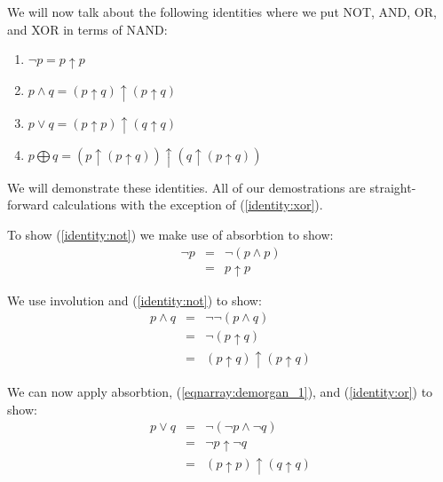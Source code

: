We will now talk about the following identities where we put NOT, AND, OR, and XOR in terms of NAND:
\begin{enumerate}
	\item $\neg p = p\uparrow p$ \label{identity:not}
	\item $p\wedge q = (p\uparrow q)\uparrow (p\uparrow q)$ \label{identity:and}
	\item $p\vee q = (p\uparrow p)\uparrow (q\uparrow q)$	\label{identity:or}
	\item $p\bigoplus q = (p\uparrow(p\uparrow q))\uparrow (q\uparrow (p\uparrow q))$ \label{identity:xor}
\end{enumerate}

We will demonstrate these identities.  All of our demostrations are straight-forward calculations with the exception of (\ref{identity:xor}).


To show (\ref{identity:not})  we make use of absorbtion to show:
\begin{eqnarray*}
 \neg p & = & \neg(p\wedge p) \\
 		& = & p \uparrow p
\end{eqnarray*}

We use involution and (\ref{identity:not}) to show:
\begin{eqnarray*}
	p \wedge q & = & \neg \neg (p\wedge q) \\
	           & = & \neg (p\uparrow q) \\
	           & = & (p\uparrow q) \uparrow (p\uparrow q)
\end{eqnarray*}

We can now apply absorbtion, (\ref{eqnarray:demorgan_1}), and (\ref{identity:or}) to show:
\begin{eqnarray}
	p \vee q &=& \neg (\neg p \wedge \neg q) \\
	         &=& \neg p \uparrow \neg q \\
	         &=& (p\uparrow p) \uparrow (q\uparrow q)
\end{eqnarray}

